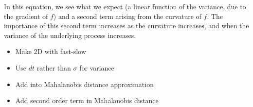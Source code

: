 \documentclass[12pt]{article}
\begin{document}
%
%
%
%

In this equation, we see what we expect (a linear function of the variance, due to the gradient of $f$) and a second term arising from the curvature of $f$.
%
The importance of this second term increases as the curvature increases, and when the variance of the underlying process increases. 


\begin{itemize}
\item Make 2D with fast-slow
\item Use $dt$ rather than $\sigma$ for variance
\item Add into Mahalanobis distance approximation
\item Add second order term in Mahalanobis distance
\end{itemize}
\end{document}
